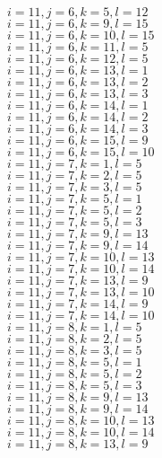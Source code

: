 \documentclass[14pt]{article}
\begin{document}
    $i=11,j=6,k=5,l=12 $ \\ 
    $i=11,j=6,k=9,l=15 $ \\ 
    $i=11,j=6,k=10,l=15 $ \\ 
    $i=11,j=6,k=11,l=5 $ \\ 
    $i=11,j=6,k=12,l=5 $ \\ 
    $i=11,j=6,k=13,l=1 $ \\ 
    $i=11,j=6,k=13,l=2 $ \\ 
    $i=11,j=6,k=13,l=3 $ \\ 
    $i=11,j=6,k=14,l=1 $ \\ 
    $i=11,j=6,k=14,l=2 $ \\ 
    $i=11,j=6,k=14,l=3 $ \\ 
    $i=11,j=6,k=15,l=9 $ \\ 
    $i=11,j=6,k=15,l=10 $ \\ 
    $i=11,j=7,k=1,l=5 $ \\ 
    $i=11,j=7,k=2,l=5 $ \\ 
    $i=11,j=7,k=3,l=5 $ \\ 
    $i=11,j=7,k=5,l=1 $ \\ 
    $i=11,j=7,k=5,l=2 $ \\ 
    $i=11,j=7,k=5,l=3 $ \\ 
    $i=11,j=7,k=9,l=13 $ \\ 
    $i=11,j=7,k=9,l=14 $ \\ 
    $i=11,j=7,k=10,l=13 $ \\ 
    $i=11,j=7,k=10,l=14 $ \\ 
    $i=11,j=7,k=13,l=9 $ \\ 
    $i=11,j=7,k=13,l=10 $ \\ 
    $i=11,j=7,k=14,l=9 $ \\ 
    $i=11,j=7,k=14,l=10 $ \\ 
    $i=11,j=8,k=1,l=5 $ \\ 
    $i=11,j=8,k=2,l=5 $ \\ 
    $i=11,j=8,k=3,l=5 $ \\ 
    $i=11,j=8,k=5,l=1 $ \\ 
    $i=11,j=8,k=5,l=2 $ \\ 
    $i=11,j=8,k=5,l=3 $ \\ 
    $i=11,j=8,k=9,l=13 $ \\ 
    $i=11,j=8,k=9,l=14 $ \\ 
    $i=11,j=8,k=10,l=13 $ \\ 
    $i=11,j=8,k=10,l=14 $ \\ 
    $i=11,j=8,k=13,l=9 $ \\ 
\end{document}
